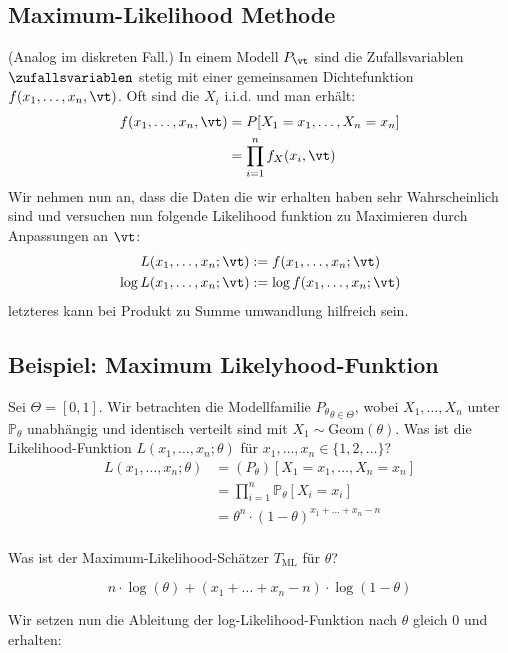 \subsection{Maximum-Likelihood Methode}
(Analog im diskreten Fall.) In einem Modell $P_\vt$ sind die Zufallsvariablen
$\zufallsvariablen$ stetig mit einer gemeinsamen Dichtefunktion
$f (x_1, \dots, x_n, \vt)$. Oft sind die $X_i$ i.i.d. und man erhält:
\begin{align*}
  f (x_1, \dots, x_n, \vt) & = P[X_1 = x_1, \dots, X_n = x_n] \\
                           & = \prod_{i = 1}^n f_X (x_i, \vt)
\end{align*}
Wir nehmen nun an, dass die Daten die wir erhalten haben sehr
Wahrscheinlich sind und versuchen nun folgende Likelihood funktion
zu Maximieren durch Anpassungen an $\vt$:
\begin{align*}
  L (x_1, \dots, x_n; \vt)      & := f (x_1, \dots, x_n; \vt)      \\
  \log L (x_1, \dots, x_n; \vt) & := \log f (x_1, \dots, x_n; \vt)
\end{align*}
letzteres kann bei Produkt zu Summe umwandlung hilfreich sein.
\BoxStart{}
\subsection{Beispiel: Maximum Likelyhood-Funktion}
Sei $\Theta = [0, 1]$. Wir betrachten die Modellfamilie $ {P_\theta}_{\theta \in \Theta}$, wobei $X_1, \ldots, X_n$ unter $\mathbb{P}_\theta$ unabhängig und identisch verteilt sind mit $X_1 \sim \text{Geom} (\theta)$. Was ist die Likelihood-Funktion $L (x_1, \ldots, x_n; \theta)$ für $x_1, \ldots, x_n \in \{1, 2, \ldots\}$?
\begin{align*}
  L (x_1, \ldots, x_n; \theta) & =  (P_\theta) [X_1 = x_1,\ldots , X_n = x_n]              \\
                               & =\prod_{i = 1}^n \mathbb{P}_\theta[X_i = x_i]             \\
                               & = \theta^n \cdot  {(1 - \theta)}^{x_1 + \ldots + x_n - n}
\end{align*}
\\
Was ist der Maximum-Likelihood-Schätzer $T_{\text{ML}}$ für $\theta$?

\[
  n \cdot \log (\theta) +  (x_1 + \ldots + x_n - n) \cdot \log (1 - \theta)
\]

Wir setzen nun die Ableitung der log-Likelihood-Funktion nach $\theta$ gleich
$0$ und erhalten:

